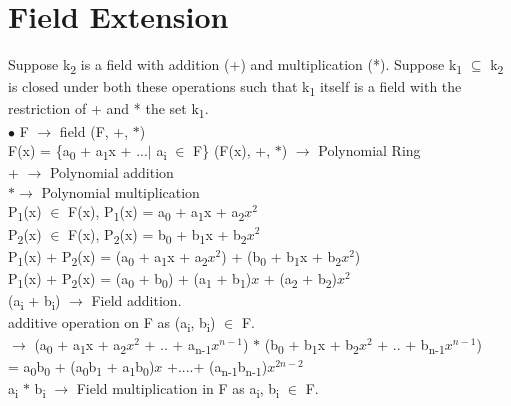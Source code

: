\documentclass[11pt]{article}
\begin{document}
	\section{Field Extension}
	Suppose k\textsubscript{2} is a field with addition (+) and multiplication (*). Suppose k\textsubscript{1} $\subseteq$ k\textsubscript{2} is closed under both these operations such that k\textsubscript{1} itself is a field with the restriction of + and * the set k\textsubscript{1}.\vspace{0.3cm}\\
	$\bullet$ F $\rightarrow$ field (F, +, $\ast$)\\
	F(x) = \{a\textsubscript{0} + a\textsubscript{1}x + ...$|$ a\textsubscript{i} $\in$ F\}\hfill
	(F(x), +, $\ast$) $\rightarrow$ Polynomial Ring\\
	+ $\rightarrow$ Polynomial addition\\
	$\ast \rightarrow$ Polynomial multiplication\\
	P\textsubscript{1}(x) $\in$ F(x), P\textsubscript{1}(x) = a\textsubscript{0} + a\textsubscript{1}x + a\textsubscript{2}$x^2$\\
	P\textsubscript{2}(x) $\in$ F(x), P\textsubscript{2}(x) = b\textsubscript{0} + b\textsubscript{1}x + b\textsubscript{2}$x^2$\\
	P\textsubscript{1}(x) + P\textsubscript{2}(x) = (a\textsubscript{0} + a\textsubscript{1}x + a\textsubscript{2}$x^2$) + (b\textsubscript{0} + b\textsubscript{1}x + b\textsubscript{2}$x^2$)\\
	P\textsubscript{1}(x) + P\textsubscript{2}(x) = (a\textsubscript{0} + b\textsubscript{0}) + (a\textsubscript{1} + b\textsubscript{1})$x$ + (a\textsubscript{2} + b\textsubscript{2})$x^2$\\
	(a\textsubscript{i} + b\textsubscript{i}) $\rightarrow$ Field addition.\\
	additive operation on F as (a\textsubscript{i}, b\textsubscript{i}) $\in$ F.\\
	$\rightarrow$ (a\textsubscript{0} + a\textsubscript{1}x + a\textsubscript{2}$x^2$ + .. + a\textsubscript{n-1}$x^{n-1}$) $\ast$ (b\textsubscript{0} + b\textsubscript{1}x + b\textsubscript{2}$x^2$ + .. + b\textsubscript{n-1}$x^{n-1}$)\\
	= a\textsubscript{0}b\textsubscript{0} + (a\textsubscript{0}b\textsubscript{1} + a\textsubscript{1}b\textsubscript{0})$x$ +....+ (a\textsubscript{n-1}b\textsubscript{n-1})$x^{2n-2}$\\
	a\textsubscript{i} $\ast$ b\textsubscript{i} $\rightarrow$ Field multiplication in F as a\textsubscript{i}, b\textsubscript{i} $\in$ F.\\
\end{document}
